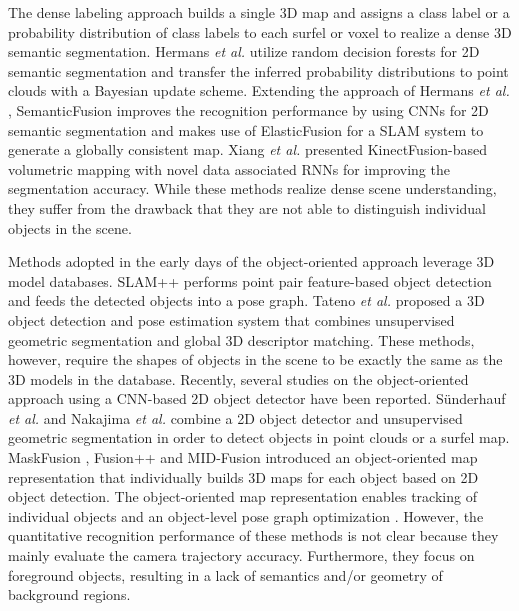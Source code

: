 \documentclass[letterpaper, 10pt, conference]{latex_template/ieeeconf}
\begin{document}
The dense labeling approach builds a single 3D map and assigns a class label or a probability distribution of class labels to each surfel or voxel to realize a dense 3D semantic segmentation.
Hermans {\it et al.} \cite{hermans2014dense} utilize random decision forests for 2D semantic segmentation and transfer the inferred probability distributions to point clouds with a Bayesian update scheme.
Extending the approach of Hermans {\it et al.} \cite{hermans2014dense}, SemanticFusion \cite{mccormac2017semanticfusion} improves the recognition performance by using CNNs for 2D semantic segmentation and makes use of ElasticFusion \cite{Whelan2015ElasticFusionDS} for a SLAM system to generate a globally consistent map.
Xiang {\it et al.} \cite{xiang2017rnn} presented KinectFusion\cite{newcombe2011kinectfusion}-based volumetric mapping with novel data associated RNNs for improving the segmentation accuracy.
While these methods realize dense scene understanding, they suffer from the drawback that they are not able to distinguish individual objects in the scene. 

Methods adopted in the early days of the object-oriented approach leverage 3D model databases.
SLAM++ \cite{salas2013slam++} performs point pair feature-based object detection and feeds the detected objects into a pose graph.
Tateno {\it et al.} \cite{tateno20162} proposed a 3D object detection and pose estimation system that combines unsupervised geometric segmentation and global 3D descriptor matching.
These methods, however, require the shapes of objects in the scene to be exactly the same as the 3D models in the database. 
Recently, several studies on the object-oriented approach using a CNN-based 2D object detector have been reported.
S{\"u}nderhauf {\it et al.} \cite{sunderhauf2017meaningful} and Nakajima {\it et al.} \cite{nakajima2019efficient} combine a 2D object detector and unsupervised geometric segmentation in order to detect objects in point clouds or a surfel map.
MaskFusion \cite{runz2018maskfusion}, Fusion++ \cite{mccormac2018fusion++} and MID-Fusion \cite{xu2018mid} introduced an object-oriented map representation that individually 
builds 3D maps for each object based on 2D object detection.
The object-oriented map representation enables tracking of individual objects \cite{runz2018maskfusion,xu2018mid} and an object-level pose graph optimization \cite{mccormac2018fusion++}.
However, the quantitative recognition performance of these methods is not clear because they mainly evaluate the camera trajectory accuracy.
Furthermore, they focus on foreground objects, resulting in a lack of semantics and/or geometry of background regions.
\end{document}

